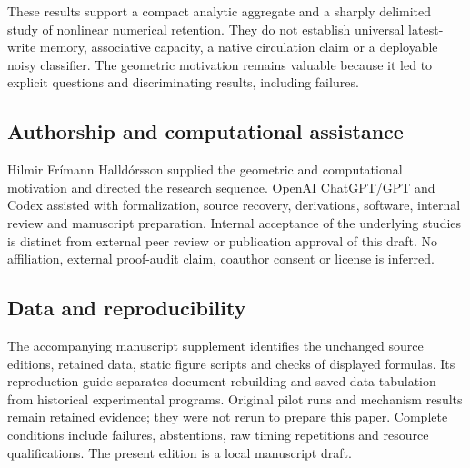 These results support a compact analytic aggregate and a sharply delimited study of nonlinear numerical retention. They do not establish universal latest-write memory, associative capacity, a native circulation claim or a deployable noisy classifier. The geometric motivation remains valuable because it led to explicit questions and discriminating results, including failures.

\subsection*{Authorship and computational assistance}
Hilmir Frímann Halldórsson supplied the geometric and computational motivation and directed the research sequence. OpenAI ChatGPT/GPT and Codex assisted with formalization, source recovery, derivations, software, internal review and manuscript preparation. Internal acceptance of the underlying studies is distinct from external peer review or publication approval of this draft. No affiliation, external proof-audit claim, coauthor consent or license is inferred.

\subsection*{Data and reproducibility}
The accompanying manuscript supplement identifies the unchanged source editions, retained data, static figure scripts and checks of displayed formulas. Its reproduction guide separates document rebuilding and saved-data tabulation from historical experimental programs. Original pilot runs and mechanism results remain retained evidence; they were not rerun to prepare this paper. Complete conditions include failures, abstentions, raw timing repetitions and resource qualifications. The present edition is a local manuscript draft.
